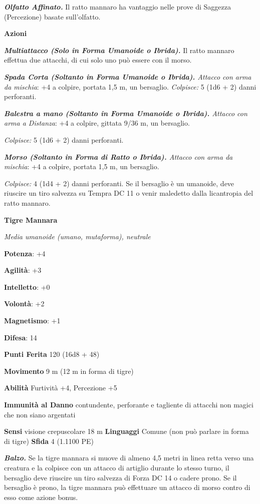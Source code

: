 \begin{multicols}{2}
\emph{\textbf{Olfatto Affinato.}} Il ratto mannaro ha vantaggio nelle
prove di Saggezza (Percezione) basate sull'olfatto.

\textbf{Azioni}

\emph{\textbf{Multiattacco (Solo in Forma Umanoide o Ibrida).}} Il ratto
mannaro effettua due attacchi, di cui solo uno può essere con il morso.

\emph{\textbf{Spada Corta (Soltanto in Forma Umanoide o Ibrida).}
Attacco con arma da mischia}: +4 a colpire, portata 1,5 m, un bersaglio.
\emph{Colpisce:} 5 (1d6 + 2) danni perforanti.

\emph{\textbf{Balestra a mano (Soltanto in Forma Umanoide o Ibrida).}
Attacco con arma a Distanza}: +4 a colpire, gittata 9/36 m, un
bersaglio.

\emph{Colpisce:} 5 (1d6 + 2) danni perforanti.

\emph{\textbf{Morso (Soltanto in Forma di Ratto o Ibrida).} Attacco con
arma da mischia}: +4 a colpire, portata 1,5 m, un bersaglio.

\emph{Colpisce:} 4 (1d4 + 2) danni perforanti. Se il bersaglio è un
umanoide, deve riuscire un tiro salvezza su Tempra DC 11 o venir
maledetto dalla licantropia del ratto mannaro.



\textbf{Tigre Mannara}

\emph{Media umanoide (umano, mutaforma), neutrale}

\textbf{Potenza}: +4

\textbf{Agilità}: +3

\textbf{Intelletto}: +0

\textbf{Volontà}: +2

\textbf{Magnetismo}: +1

\textbf{Difesa}: 14

\textbf{Punti Ferita} 120 (16d8 + 48)

\textbf{Movimento} 9 m (12 m in forma di tigre)

\textbf{Abilità} Furtività +4, Percezione +5

\textbf{Immunità al Danno} contundente, perforante e tagliente di
attacchi non magici che non siano argentati

\textbf{Sensi} visione crepuscolare 18 m
\textbf{Linguaggi} Comune (non può parlare in forma di tigre)
\textbf{Sfida} 4 (1.1100 PE)

\emph{\textbf{Balzo.}} Se la tigre mannara si muove di almeno 4,5 metri
in linea retta verso una creatura e la colpisce con un attacco di
artiglio durante lo stesso turno, il bersaglio deve riuscire un tiro
salvezza di Forza DC 14 o cadere prono. Se il bersaglio è prono, la
tigre mannara può effettuare un attacco di morso contro di esso come
azione bonus.


\end{multicols}

